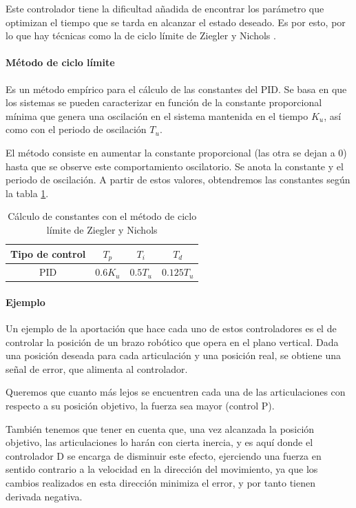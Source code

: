 Este controlador tiene la dificultad añadida de encontrar los parámetro que optimizan el tiempo que se tarda en alcanzar el estado deseado. Es por esto, por lo que hay técnicas como la de ciclo límite de Ziegler y Nichols \cite{valerio2006tuning}.

\paragraph{Método de ciclo límite}
Es un método empírico para el cálculo de las constantes del PID. Se basa en que los sistemas se pueden caracterizar en función de la constante proporcional mínima que genera una oscilación en el sistema mantenida en el tiempo $K_u$, así como con el periodo de oscilación $T_u$.

El método consiste en aumentar la constante proporcional (las otra se dejan a 0) hasta que se observe este comportamiento oscilatorio. Se anota la constante y el periodo de oscilación. A partir de estos valores, obtendremos las constantes según la tabla \ref{tab:metodos/pid}.
\begin{table}[]
	\centering
	\caption{Cálculo de constantes con el método de ciclo límite de Ziegler y Nichols}
	\label{tab:metodos/pid}
	\begin{tabular}{c|ccc}
		Tipo de control & $T_p$     & $T_i$    & $T_d$      \\ \hline
		PID             & $0.6 K_u$ & $0.5T_u$ & $0.125T_u$
	\end{tabular}
\end{table}
\paragraph{Ejemplo}
Un ejemplo de la aportación que hace cada uno de estos controladores es el de controlar la posición de un brazo robótico que opera en el plano vertical. Dada una posición deseada para cada articulación y una posición real, se obtiene una señal de error, que alimenta al controlador.

Queremos que cuanto más lejos se encuentren cada una de las articulaciones con respecto a su posición objetivo, la fuerza sea mayor (control P).

También tenemos que tener en cuenta que, una vez alcanzada la posición objetivo, las articulaciones lo harán con cierta inercia, y es aquí donde el controlador D se encarga de disminuir este efecto, ejerciendo una fuerza en sentido contrario a la velocidad en la dirección del movimiento, ya que los cambios realizados en esta dirección minimiza el error, y por tanto tienen derivada negativa.

